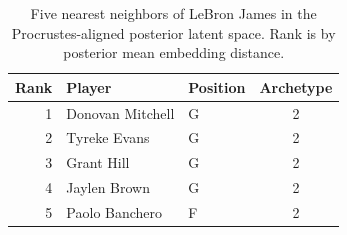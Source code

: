 \begin{table}[htbp]
  \centering\small
  \begin{tabular}{rllc}
    \toprule
    Rank & Player & Position & Archetype \\
    \midrule
    1 & Donovan Mitchell & G & 2 \\
    2 & Tyreke Evans & G & 2 \\
    3 & Grant Hill & G & 2 \\
    4 & Jaylen Brown & G & 2 \\
    5 & Paolo Banchero & F & 2 \\
    \bottomrule
  \end{tabular}
  \caption{Five nearest neighbors of LeBron James in the Procrustes-aligned posterior latent space. Rank is by posterior mean embedding distance.}
  \label{tab:LeBron_James_neighbors}
\end{table}

